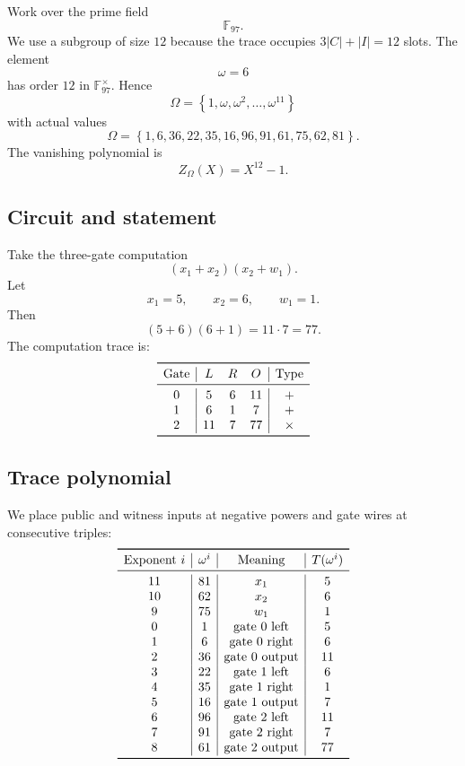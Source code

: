 \documentclass[11pt]{article}
\newcommand{\F}{\mathbb{F}}
\newcommand{\set}[1]{\left\{#1\right\}}
\begin{document}
Work over the prime field
\[
    \F_{97}.
\]
We use a subgroup of size $12$ because the trace occupies $3|C|+|I|=12$ slots. The element
\[
    \omega=6
\]
has order $12$ in $\F_{97}^\times$. Hence
\[
    \Omega=\set{1,\omega,\omega^2,\ldots,\omega^{11}}
\]
with actual values
\[
    \Omega=\set{1,6,36,22,35,16,96,91,61,75,62,81}.
\]
The vanishing polynomial is
\[
    Z_\Omega(X)=X^{12}-1.
\]

\subsection{Circuit and statement}

Take the three-gate computation
\[
    (x_1+x_2)(x_2+w_1).
\]
Let
\[
    x_1=5,
    \qquad
    x_2=6,
    \qquad
    w_1=1.
\]
Then
\[
    (5+6)(6+1)=11\cdot7=77.
\]
The computation trace is:
\[
\begin{array}{c|ccc|c}
\toprule
\text{Gate} & L & R & O & \text{Type}\\
\midrule
0 & 5 & 6 & 11 & +\\
1 & 6 & 1 & 7 & +\\
2 & 11 & 7 & 77 & \times\\
\bottomrule
\end{array}
\]

\subsection{Trace polynomial}

We place public and witness inputs at negative powers and gate wires at consecutive triples:
\[
\begin{array}{c|c|c|c}
\toprule
\text{Exponent }i & \omega^i & \text{Meaning} & T(\omega^i)\\
\midrule
11 & 81 & x_1 & 5\\
10 & 62 & x_2 & 6\\
9 & 75 & w_1 & 1\\
0 & 1 & \text{gate 0 left} & 5\\
1 & 6 & \text{gate 0 right} & 6\\
2 & 36 & \text{gate 0 output} & 11\\
3 & 22 & \text{gate 1 left} & 6\\
4 & 35 & \text{gate 1 right} & 1\\
5 & 16 & \text{gate 1 output} & 7\\
6 & 96 & \text{gate 2 left} & 11\\
7 & 91 & \text{gate 2 right} & 7\\
8 & 61 & \text{gate 2 output} & 77\\
\bottomrule
\end{array}
\]
\end{document}
